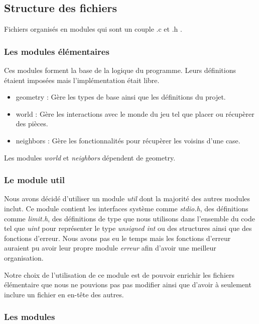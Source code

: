 \subsection{Structure des fichiers}

Fichiers organisés en modules qui sont un couple .c et .h .  

\subsubsection{Les modules élémentaires}

Ces modules forment la base de la logique du programme.
Leurs définitions étaient imposées mais l'implémentation était libre. 

\begin{itemize}
    \item geometry : Gère les types de base ainsi que les définitions du projet.
    \item world : Gère les interactions avec le monde du jeu tel que placer ou récupèrer des pièces.
    \item neighbors : Gère les fonctionnalités pour récupèrer les voisins d'une case.
\end{itemize}

Les modules \emph{world} et \emph{neighbors} dépendent de geometry.


\subsubsection{Le module util}
\label{ssec:module-util}
Nous avons décidé d'utiliser un module \emph{util} dont la majorité des autres modules inclut. 
Ce module contient les interfaces système comme \emph{stdio.h}, des définitions comme \emph{limit.h},
des définitions de type que nous utilisons dans l'ensemble du code tel que \emph{uint} pour représenter
le type \emph{unsigned int} ou des structures ainsi que des fonctions d'erreur. Nous avons pas eu le temps
mais les fonctions d'erreur auraient pu avoir leur propre module \emph{erreur} afin d'avoir une meilleur organisation.

Notre choix de l'utilisation de ce module est de pouvoir enrichir les fichiers élémentaire que nous ne pouvions pas
pas modifier ainsi que d'avoir à seulement inclure un fichier en en-tête des autres.  


\subsubsection{Les modules}

